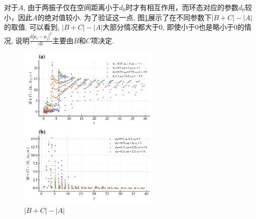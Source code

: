 \documentclass{article}
\begin{document}
对于$A$, 由于两振子仅在空间距离小于$d_0$时才有相互作用，而环态对应的参数$d_0$较小，因此$A$的绝对值较小. 为了验证这一点, 图\ref{fig:2OsBCsubA}展示了在不同参数下$|B+C|-|A|$的取值. 可以看到, $|B+C|-|A|$大部分情况都大于0, 即使小于0也是略小于0的情况, 说明$\frac{\mathrm{d}\left| \mathbf{c}_i-\mathbf{c}_j \right|^2}{\mathrm{dt}}$主要由$B$和$C$项决定.

\begin{figure}[H]
    \centering
    \includegraphics[width=0.6\textwidth]{./figs/2OsBCsubA.pdf}
    \caption{$|B+C|-|A|$}
    \label{fig:2OsBCsubA}
\end{figure}
\end{document}
